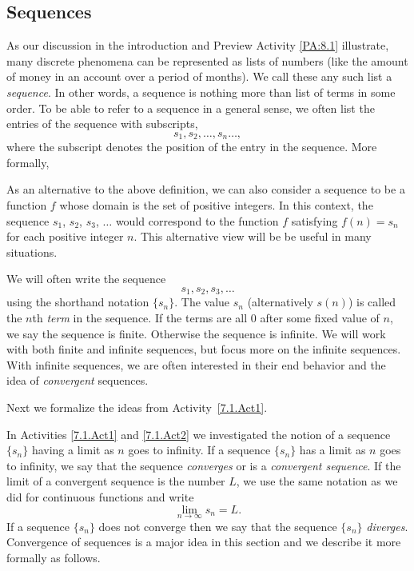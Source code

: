 
\subsection*{Sequences} 

As our discussion in the introduction and Preview Activity \ref{PA:8.1} illustrate, many discrete phenomena can be represented as lists of numbers (like the amount of money in an account over a period of months). We call these any such list a \emph{sequence}. In other words, a sequence is nothing more than list of terms in some order. To be able to refer to a sequence in a general sense, we often list the entries of the sequence with subscripts,
\[s_1, s_2, \ldots, s_n \ldots,\]
where the subscript denotes the position of the entry in the sequence. More formally,


As an alternative to the above definition, we can also consider a sequence to be a function $f$ whose domain is the set of positive integers. In this context, the sequence $s_1$, $s_2$, $s_3$, $\ldots$ would correspond to the function $f$ satisfying $f(n) = s_n$ for each positive integer $n$. This alternative view will be be useful in many situations. 

We will often write the sequence
\[s_1, s_2, s_3, \ldots\]
using the shorthand notation $\{s_n\}$. The value $s_n$ (alternatively $s(n)$) is called the $n$th \emph{term} in the sequence. If the terms are all 0 after some fixed value of $n$, we say the sequence is finite. Otherwise the sequence is infinite. We will work with both finite and infinite sequences, but focus more on the infinite sequences. With infinite sequences, we are often interested in their end behavior and the idea of \emph{convergent} sequences.


Next we formalize the ideas from Activity~\ref{7.1.Act1}.


In Activities \ref{7.1.Act1} and \ref{7.1.Act2} we investigated the notion of a sequence $\{s_n\}$ having a limit as $n$ goes to infinity. If a sequence $\{s_n\}$ has a limit as $n$ goes to infinity, we say that the sequence \emph{converges} or is a \emph{convergent sequence}. If the limit of a convergent sequence is the number $L$, we use the same notation as we did for continuous functions and write
\[\lim_{n \to \infty} s_n = L.\]
If a sequence $\{s_n\}$ does not converge then we say that the sequence $\{s_n\}$ \emph{diverges}. Convergence of sequences is a major idea in this section and we describe it more formally as follows.

